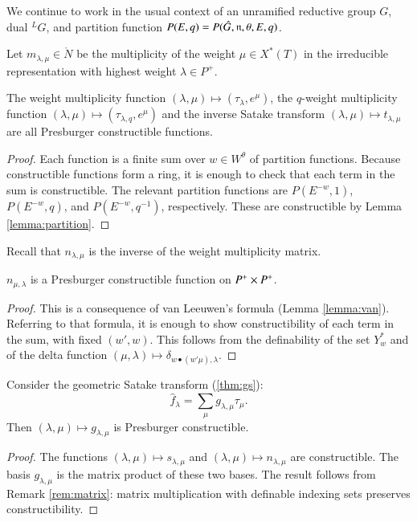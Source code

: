 We continue to work in the usual context of an unramified reductive
group $G$, dual ${}^LG$, and partition function
$P(E,q)=P(\hat G,{\mathfrak n},\theta,E,q)$.


Let $m_{\lambda,\mu}\in \ring{N}$ be the multiplicity of the weight
$\mu\in X^*(T)$ in the irreducible representation with highest weight
$\lambda\in P^+$.

\begin{lemma}  
  The weight multiplicity function $(\lambda,\mu)\mapsto
  (\tau_\lambda,e^\mu)$, the $q$-weight multiplicity function
  $(\lambda,\mu)\mapsto (\tau_{\lambda,q},e^\mu)$ and the inverse
  Satake transform $(\lambda,\mu)\mapsto t_{\lambda,\mu}$ are all
  Presburger constructible functions.
\end{lemma}

\begin{proof} 
  Each function is a finite sum over $w\in W^\theta$ of partition
  functions.  Because constructible functions form a ring, it is
  enough to check that each term in the sum is constructible.  The
  relevant partition functions are $P(E^{-w},1)$, $P(E^{-w},q)$,
  and $P(E^{-w},q^{-1})$, respectively.  These are constructible by
  Lemma \ref{lemma:partition}.
\end{proof}

Recall that $n_{\lambda,\mu}$ is the inverse of the weight
multiplicity matrix.

\begin{theorem}\label{lemma:van-leeuwen} 
  $n_{\mu,\lambda}$ is a Presburger constructible function on
  $P^+\times P^+$.
\end{theorem}

\begin{proof} 
  This is a consequence of van Leeuwen's formula (Lemma
  \ref{lemma:van}).  Referring to that formula, it is enough to show
  constructibility of each term in the sum, with fixed $(w',w)$.  This
  follows from the definability of the set $Y^*_w$ and of the delta
  function $(\mu,\lambda)\mapsto \delta_{w\bullet (w'\mu),\lambda}$.
\end{proof}

\begin{corollary} 
  Consider the geometric Satake transform (\ref{thm:gs}):
\[
\hat f_\lambda = \sum_\mu g_{\lambda,\mu} \tau_\mu.
\]
Then $(\lambda,\mu)\mapsto g_{\lambda,\mu}$ is Presburger
constructible.
\end{corollary}

\begin{proof}  
  The functions $(\lambda,\mu)\mapsto s_{\lambda,\mu}$ and
  $(\lambda,\mu)\mapsto n_{\lambda,\mu}$ are constructible.  The basis
  $g_{\lambda,\mu}$ is the matrix product of these two bases.  The
  result follows from Remark \ref{rem:matrix}: matrix multiplication
  with definable indexing sets preserves constructibility.
\end{proof}

